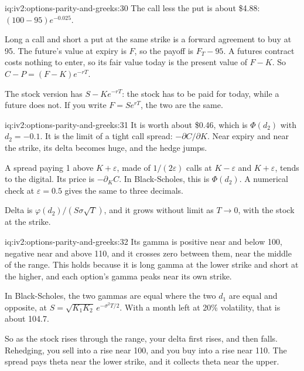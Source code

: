 \begin{solution}{iq:iv2:options-parity-and-greeks:30}
The call less the put is about \$4.88: $(100 - 95)e^{-0.025}$.

Long a call and short a put at the same strike is a forward agreement to buy at 95. The future's value at expiry is $F$, so the payoff is $F_T - 95$. A futures contract costs nothing to enter, so its fair value today is the present value of $F - K$. So $C - P = (F - K)e^{-rT}$.

The stock version has $S - Ke^{-rT}$: the stock has to be paid for today, while a future does not. If you write $F = Se^{rT}$, the two are the same.

\end{solution}

\begin{solution}{iq:iv2:options-parity-and-greeks:31}
It is worth about \$0.46, which is $\Phi(d_2)$ with $d_2 = -0.1$. It is the limit of a tight call spread: $-\partial C/\partial K$. Near expiry and near the strike, its delta becomes huge, and the hedge jumps.

A spread paying 1 above $K + \varepsilon$, made of $1/(2\varepsilon)$ calls at $K - \varepsilon$ and $K + \varepsilon$, tends to the digital. Its price is $-\partial_K C$. In Black-Scholes, this is $\Phi(d_2)$. A numerical check at $\varepsilon = 0.5$ gives the same to three decimals.

Delta is $\varphi(d_2)/(S\sigma\sqrt T)$, and it grows without limit as $T \to 0$, with the stock at the strike.

\end{solution}

\begin{solution}{iq:iv2:options-parity-and-greeks:32}
Its gamma is positive near and below 100, negative near and above 110, and it crosses zero between them, near the middle of the range. This holds because it is long gamma at the lower strike and short at the higher, and each option's gamma peaks near its own strike.

In Black-Scholes, the two gammas are equal where the two $d_1$ are equal and opposite, at $S = \sqrt{K_1K_2}\,e^{-\sigma^2T/2}$. With a month left at 20\% volatility, that is about 104.7.

So as the stock rises through the range, your delta first rises, and then falls. Rehedging, you sell into a rise near 100, and you buy into a rise near 110. The spread pays theta near the lower strike, and it collects theta near the upper.

\end{solution}

